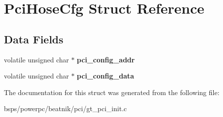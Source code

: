 \hypertarget{structPciHoseCfg}{}\section{Pci\+Hose\+Cfg Struct Reference}
\label{structPciHoseCfg}
\subsection*{Data Fields}
\begin{DoxyCompactItemize}
\item 
\mbox{\label{structPciHoseCfg_a084ae520b70d73ba9d7b210039048d6e}} 
volatile unsigned char $\ast$ {\bfseries pci\+\_\+config\+\_\+addr}
\item 
\mbox{\label{structPciHoseCfg_a07807a41dc22b07a8277dfc1bb59888a}} 
volatile unsigned char $\ast$ {\bfseries pci\+\_\+config\+\_\+data}
\end{DoxyCompactItemize}


The documentation for this struct was generated from the following file\+:\begin{DoxyCompactItemize}
\item 
bsps/powerpc/beatnik/pci/gt\+\_\+pci\+\_\+init.\+c\end{DoxyCompactItemize}
